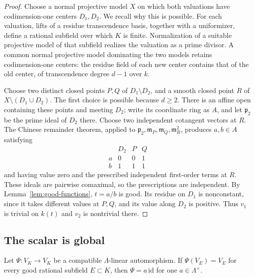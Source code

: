 \begin{proof}
Choose a normal projective model $X$ on which both valuations have
codimension-one centers $D_1,D_2$. We recall why this is possible.
For each valuation, lifts of a residue transcendence basis, together
with a uniformizer, define a rational subfield over which $K$ is finite.
Normalization of a suitable projective model of that subfield realizes
the valuation as a prime divisor. A common normal projective model
dominating the two models retains codimension-one centers: the residue
field of each new center contains that of the old center, of
transcendence degree $d-1$ over $k$.

Choose two distinct closed points $P,Q$ of $D_1\setminus D_2$, and a
smooth closed point $R$ of $X\setminus(D_1\cup D_2)$. The first choice
is possible because $d\ge2$. There is an affine open containing these
points and meeting $D_2$; write its coordinate ring as $A$, and let
$\mathfrak p_2$ be the prime ideal of $D_2$ there. Choose two independent
cotangent vectors at $R$. The Chinese remainder theorem, applied to
$\mathfrak p_2,\mathfrak m_P,\mathfrak m_Q,\mathfrak m_R^2$, produces
$a,b\in A$ satisfying
\[
\begin{array}{c|ccc}
 & D_2 & P & Q\\ \hline
 a &0&0&1\\
 b &1&1&1
\end{array}
\]
and having value zero and the prescribed independent first-order terms
at $R$. These ideals are pairwise comaximal, so the prescriptions are
independent. By Lemma~\ref{lem:good-functions}, $t=a/b$ is good.
Its residue on $D_1$ is nonconstant, since it takes different values
at $P,Q$, and its value along $D_2$ is positive. Thus $v_1$ is trivial
on $k(t)$ and $v_2$ is nontrivial there.
\end{proof}

\subsection{The scalar is global}

\begin{proposition}\label{prop:global-scalar}
Let $\Psi:V_K\to V_K$ be a compatible $\Lambda$-linear automorphism.
If $\Psi(V_E)=V_E$ for every good rational subfield $E\subset K$,
then $\Psi=a\,\mathrm{id}$ for one $a\in\Lambda^\times$.
\end{proposition}

